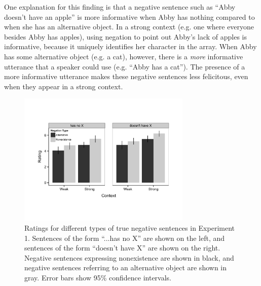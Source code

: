 \documentclass[10pt,letterpaper]{article}
\begin{document}
One explanation for this finding is that a negative sentence such as ``Abby doesn't have an apple'' is more informative when Abby has nothing compared to when she has an alternative object.  In a strong context (e.g. one where everyone besides Abby has apples), using negation to point out Abby's lack of apples is informative, because it uniquely identifies her character in the array.  When Abby has some alternative object (e.g. a cat), however, there is a \emph{more} informative utterance that a speaker could use (e.g. ``Abby has a cat'').  The presence of a more informative utterance makes these negative sentences less felicitous, even when they appear in a strong context.




\begin{figure}
\begin{center} 
\includegraphics[width=3.25in]{figures/study1.pdf}
\caption{\label{fig:s1} Ratings for different types of true negative sentences in Experiment 1.  Sentences of the form ``...has no X'' are shown on the left, and sentences of the form ``doesn't have X'' are shown on the right.  Negative sentences expressing nonexistence are shown in black, and negative sentences referring to an alternative object are shown in gray.  Error bars show 95\% confidence intervals.}
\end{center} 
\end{figure}
\end{document}
